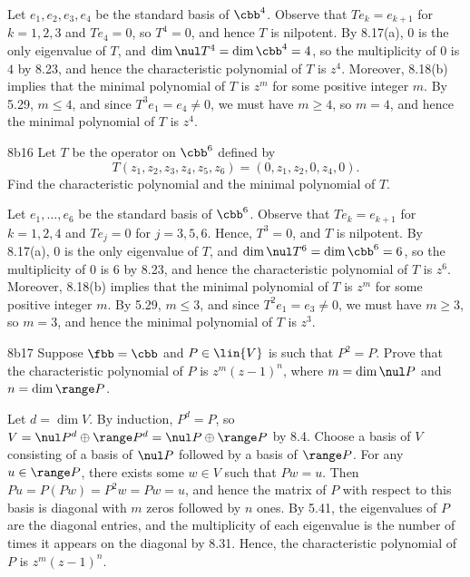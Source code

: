 \begin{sol}
    Let $e_1, e_2, e_3, e_4$ be the standard basis of $\cbb^4$.
    Observe that $T e_k = e_{k+1}$ for $k = 1, 2, 3$ and $T e_4 = 0$, so $T^4 = 0$, and hence $T$ is nilpotent.
    By 8.17(a), $0$ is the only eigenvalue of $T$, and $\dim \nul T^4 = \dim \cbb^4 = 4$, so the multiplicity of $0$ is $4$ by 8.23, and hence the characteristic polynomial of $T$ is $z^4$.
    Moreover, 8.18(b) implies that the minimal polynomial of $T$ is $z^m$ for some positive integer $m$.
    By 5.29, $m \leq 4$, and since $T^3 e_1 = e_4 \neq 0$, we must have $m \geq 4$, so $m = 4$, and hence the minimal polynomial of $T$ is $z^4$.
\end{sol}

\begin{exercise}{8b16}
    Let $T$ be the operator on $\cbb^6$ defined by
    \[
        T(z_1, z_2, z_3, z_4, z_5, z_6) = (0, z_1, z_2, 0, z_4, 0).
    \]
    Find the characteristic polynomial and the minimal polynomial of $T$.
\end{exercise}

\begin{sol}
    Let $e_1, \ldots, e_6$ be the standard basis of $\cbb^6$.
    Observe that $T e_k = e_{k+1}$ for $k = 1, 2, 4$ and $T e_j = 0$ for $j = 3, 5, 6$.
    Hence, $T^3 = 0$, and $T$ is nilpotent.
    By 8.17(a), $0$ is the only eigenvalue of $T$, and $\dim \nul T^6 = \dim \cbb^6 = 6$, so the multiplicity of $0$ is $6$ by 8.23, and hence the characteristic polynomial of $T$ is $z^6$.
    Moreover, 8.18(b) implies that the minimal polynomial of $T$ is $z^m$ for some positive integer $m$.
    By 5.29, $m \leq 3$, and since $T^2 e_1 = e_3 \neq 0$, we must have $m \geq 3$, so $m = 3$, and hence the minimal polynomial of $T$ is $z^3$.
\end{sol}

\begin{exercise}{8b17}
    Suppose $\fbb = \cbb$ and $P \in \lin{V}$ is such that $P^2 = P$.
    Prove that the characteristic polynomial of $P$ is $z^m (z - 1)^n$, where $m = \dim \nul P$ and $n = \dim \range P$.
\end{exercise}

\begin{sol}
    Let $d = \dim V$.
    By induction, $P^d = P$, so $V = \nul P^d \oplus \range P^d = \nul P \oplus \range P$ by 8.4.
    Choose a basis of $V$ consisting of a basis of $\nul P$ followed by a basis of $\range P$.
    For any $u \in \range P$, there exists some $w \in V$ such that $Pw = u$.
    Then $P u = P(P w) = P^2 w = P w = u$, and hence the matrix of $P$ with respect to this basis is diagonal with $m$ zeros followed by $n$ ones.
    By 5.41, the eigenvalues of $P$ are the diagonal entries, and the multiplicity of each eigenvalue is the number of times it appears on the diagonal by 8.31.
    Hence, the characteristic polynomial of $P$ is $z^m (z - 1)^n$.
\end{sol}

